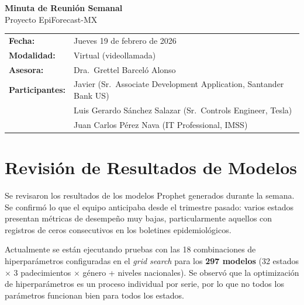 \documentclass[11pt,letterpaper]{article}
\begin{document}
\begin{center}
    {\LARGE\bfseries\textcolor{imssgreen}{Minuta de Reunión Semanal}}\\[0.3em]
    {\large\textcolor{imssgray}{Proyecto EpiForecast-MX}}\\[1.5em]
\end{center}

\noindent
\begin{tabular}{@{}ll}
    \textbf{Fecha:}       & Jueves 19 de febrero de 2026 \\
    \textbf{Modalidad:}   & Virtual (videollamada) \\
    \textbf{Asesora:}     & Dra.\ Grettel Barceló Alonso \\
    \textbf{Participantes:} & Javier (Sr.\ Associate Development Application, Santander Bank US) \\
                          & Luis Gerardo Sánchez Salazar (Sr.\ Controls Engineer, Tesla) \\
                          & Juan Carlos Pérez Nava (IT Professional, IMSS) \\
\end{tabular}

\vspace{1em}

\section{Revisión de Resultados de Modelos}

Se revisaron los resultados de los modelos Prophet generados durante la semana. Se confirmó lo que el equipo anticipaba desde el trimestre pasado: varios estados presentan métricas de desempeño muy bajas, particularmente aquellos con registros de ceros consecutivos en los boletines epidemiológicos.

Actualmente se están ejecutando pruebas con las 18 combinaciones de hiperparámetros configuradas en el \textit{grid search} para los \textbf{297 modelos} (32 estados $\times$ 3 padecimientos $\times$ género + niveles nacionales). Se observó que la optimización de hiperparámetros es un proceso individual por serie, por lo que no todos los parámetros funcionan bien para todos los estados.

\end{document}
